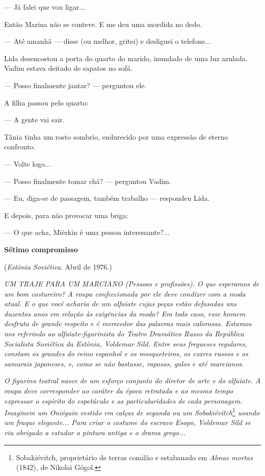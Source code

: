 --- Já falei que vou ligar...

Então Marina não se conteve. E me deu uma mordida no dedo.

--- Até amanhã --- disse (ou melhor, gritei) e desliguei o telefone...

Lida desencostou a porta do quarto do marido, inundado de uma luz
azulada. Vadim estava deitado de sapatos no sofá.

--- Posso finalmente jantar? --- perguntou ele.

A filha passou pelo quarto:

--- A gente vai sair.

Tânia tinha um rosto sombrio, endurecido por uma expressão de eterno
confronto.

--- Volte logo...

--- Posso finalmente tomar chá? --- perguntou Vadim.

--- Eu, diga-se de passagem, também trabalho --- respondeu Lida.

E depois, para não provocar uma briga:

--- O que acha, Miérkin é uma pessoa interessante?...

\textbf{Sétimo compromisso}

(\emph{Estônia Soviética}. Abril de 1976.)

\emph{UM TRAJE PARA UM MARCIANO (Pessoas e profissões). O que esperamos
de um bom costureiro? A roupa confeccionada por ele deve condizer com a
moda atual. E o que você acharia de um alfaiate cujas peças estão
defasadas uns duzentos anos em relação às exigências da moda? Em todo
caso, esse homem desfruta de grande respeito e é merecedor das palavras
mais calorosas. Estamos nos referindo ao alfaiate-figurinista do Teatro
Dramático Russo da República Socialista Soviética da Estônia, Voldemar
Sild. Entre seus fregueses regulares, constam os grandes do reino
espanhol e os mosqueteiros, os czares russos e os samurais japoneses, e,
como se não bastasse, raposas, galos e até marcianos.}

\emph{O figurino teatral nasce de um esforço conjunto do diretor de arte
e do alfaiate. A roupa deve corresponder ao caráter da época retratada e
ao mesmo tempo expressar o espírito do espetáculo e as particularidades
de cada personagem. Imaginem um Oniéguin vestido em calças de segunda ou
um Sobakiévitch}\footnote{Sobakiévitch, proprietário de terras comilão e
  estabanado em \emph{Almas mortas} (1842)\emph{,} de Nikolai Gógol.}
\emph{usando um fraque elegante... Para criar o costume do escravo
Esopo, Voldemar Sild se viu obrigado a estudar a pintura antiga e o
drama grego...}

